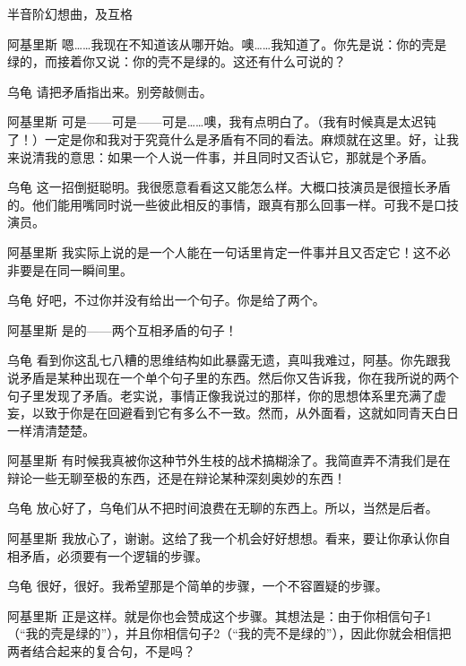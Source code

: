 \begin{dialog}{半音阶幻想曲，及互格}
\begin{dialogue}
\item[阿基里斯]嗯……我现在不知道该从哪开始。噢……我知道了。你先是说：你的壳是绿的，而接着你又说：你的壳不是绿的。这还有什么可说的？

\item[乌龟]请把矛盾指出来。别旁敲侧击。

\item[阿基里斯]可是——可是——可是……噢，我有点明白了。（我有时候真是太迟钝了！）一定是你和我对于究竟什么是矛盾有不同的看法。麻烦就在这里。好，让我来说清我的意思：如果一个人说一件事，并且同时又否认它，那就是个矛盾。

\item[乌龟]这一招倒挺聪明。我很愿意看看这又能怎么样。大概口技演员是很擅长矛盾的。他们能用嘴同时说一些彼此相反的事情，跟真有那么回事一样。可我不是口技演员。

\item[阿基里斯]我实际上说的是一个人能在一句话里肯定一件事并且又否定它！这不必非要是在同一瞬间里。

\item[乌龟]好吧，不过你并没有给出一个句子。你是给了两个。

\item[阿基里斯]是的——两个互相矛盾的句子！

\item[乌龟]看到你这乱七八糟的思维结构如此暴露无遗，真叫我难过，阿基。你先跟我说矛盾是某种出现在一个单个句子里的东西。然后你又告诉我，你在我所说的两个句子里发现了矛盾。老实说，事情正像我说过的那样，你的思想体系里充满了虚妄，以致于你是在回避看到它有多么不一致。然而，从外面看，这就如同青天白日一样清清楚楚。

\item[阿基里斯]有时候我真被你这种节外生枝的战术搞糊涂了。我简直弄不清我们是在辩论一些无聊至极的东西，还是在辩论某种深刻奥妙的东西！

\item[乌龟]放心好了，乌龟们从不把时间浪费在无聊的东西上。所以，当然是后者。

\item[阿基里斯]我放心了，谢谢。这给了我一个机会好好想想。看来，要让你承认你自相矛盾，必须要有一个逻辑的步骤。

\item[乌龟]很好，很好。我希望那是个简单的步骤，一个不容置疑的步骤。

\item[阿基里斯]正是这样。就是你也会赞成这个步骤。其想法是：由于你相信句子1（“我的壳是绿的”），并且你相信句子2（“我的壳不是绿的”），因此你就会相信把两者结合起来的复合句，不是吗？


\end{dialogue}
\end{dialog}
